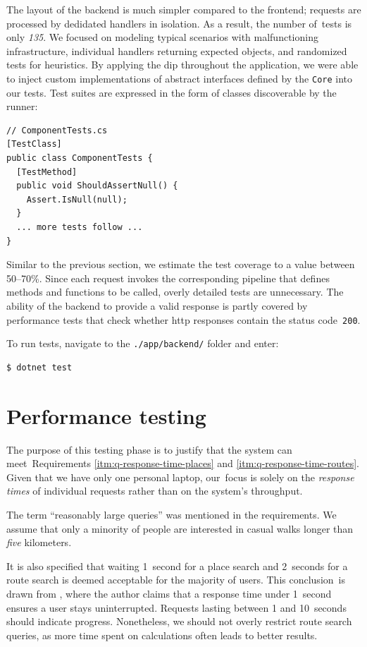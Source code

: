 The layout of the backend is much simpler compared to the frontend; requests are processed by dedidated handlers in isolation. As a result, the number of~tests is only \emph{135}. We focused on modeling typical scenarios with malfunctioning in\-fras\-truc\-ture, individual handlers returning expected objects, and randomized tests for heuristics. By applying the \acs{dip} throughout the application, we were able to inject custom implementations of abstract interfaces defined by the \texttt{Core} into our tests. Test suites are expressed in the form of classes discoverable by the runner:

\begin{verbatim}
// ComponentTests.cs
[TestClass]
public class ComponentTests {
  [TestMethod]
  public void ShouldAssertNull() {
    Assert.IsNull(null);
  }
  ... more tests follow ...
}
\end{verbatim}

Similar to the previous section, we estimate the test coverage to a value between 50--70\%. Since each request invokes the corresponding pipeline that defines methods and functions to be called, overly detailed tests are unnecessary. The abil\-i\-ty of the backend to provide a valid response is partly covered by performance tests that check whether \acs{http} responses contain the status code~\texttt{200}.

To run tests, navigate to the \texttt{./app/backend/} folder and enter:

\begin{verbatim}
$ dotnet test
\end{verbatim}

\section{Performance testing}\label{sec:perf-testing}

The purpose of this testing phase is to justify that the system can meet~Requirements \ref{itm:q-response-time-places} and \ref{itm:q-response-time-routes}. Given that we have only one personal laptop, our~focus is solely on the \emph{response times} of individual requests rather than on the system's throughput.

The term ``reasonably large queries'' was mentioned in the requirements. We assume that only a minority of people are interested in casual walks longer than \emph{five} kilometers.

It is also specified that waiting 1~second for a place search and 2~seconds for a route search is deemed acceptable for the majority of users. This conclusion~is drawn from \cite{nielsen93}, where the author claims that a response time under 1~second ensures a user stays uninterrupted. Requests lasting between 1 and 10~seconds should indicate progress. Nonetheless, we should not overly restrict route search queries, as more time spent on calculations often leads to better results.

